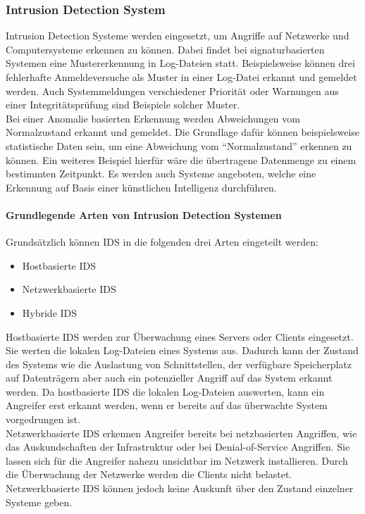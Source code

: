 \subsubsection{Intrusion Detection System}

Intrusion Detection Systeme werden eingesetzt, um Angriffe auf Netzwerke und Computersysteme erkennen zu können. Dabei findet bei signaturbasierten Systemen eine Mustererkennung in Log-Dateien statt. Beispielsweise können drei fehlerhafte Anmeldeversuche als Muster in einer Log-Datei erkannt und gemeldet werden. Auch Systemmeldungen verschiedener Priorität oder Warnungen aus einer Integritätsprüfung sind Beispiele solcher Muster.\\
Bei einer Anomalie basierten Erkennung werden Abweichungen vom Normalzustand erkannt und gemeldet. Die Grundlage dafür können beispielsweise statistische Daten sein, um eine Abweichung vom "`Normalzustand"' erkennen zu können. Ein weiteres Beispiel hierfür wäre die übertragene Datenmenge zu einem bestimmten Zeitpunkt. Es werden auch Systeme angeboten, welche eine Erkennung auf Basis einer künstlichen Intelligenz durchführen.   

\paragraph{Grundlegende Arten von Intrusion Detection Systemen}
Grundsätzlich können \ac{IDS} in die folgenden drei Arten eingeteilt werden:

\begin{itemize}
\item Hostbasierte \ac{IDS}
\item Netzwerkbasierte \ac{IDS}
\item Hybride \ac{IDS}
\end{itemize}

\noindent Hostbasierte \ac{IDS} werden zur Überwachung eines Servers oder Clients eingesetzt. Sie werten die lokalen Log-Dateien eines Systems aus. Dadurch kann der Zustand des Systems wie die Auslastung von Schnittstellen, der verfügbare Speicherplatz auf Datenträgern aber auch ein potenzieller Angriff auf das System erkannt werden. Da hostbasierte \ac{IDS} die lokalen Log-Dateien auswerten, kann ein Angreifer erst erkannt werden, wenn er bereits auf das überwachte System vorgedrungen ist.\\ 

\noindent Netzwerkbasierte \ac{IDS} erkennen Angreifer bereits bei netzbasierten Angriffen, wie das Auskundschaften der Infrastruktur oder bei Denial-of-Service Angriffen. Sie lassen sich für die Angreifer nahezu unsichtbar im Netzwerk installieren. Durch die Überwachung der Netzwerke werden die Clients nicht belastet. Netzwerkbasierte \ac{IDS} können jedoch keine Auskunft über den Zustand einzelner Systeme geben.\\ 

